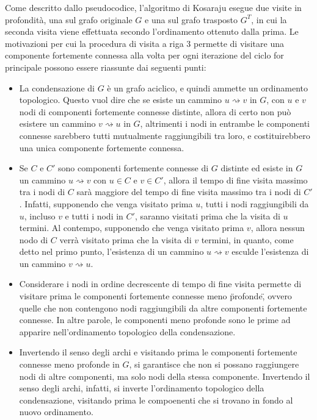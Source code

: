 

Come descritto dallo pseudocodice, l'algoritmo di Kosaraju esegue due visite in profondit\`a, una sul grafo
originale $G$ e una sul grafo trasposto $G^T$, in cui la seconda visita viene effettuata secondo l'ordinamento
ottenuto dalla prima.
Le motivazioni per cui la procedura di visita a riga 3 permette di visitare una componente fortemente
connessa alla volta per ogni iterazione del ciclo for principale possono essere riassunte dai seguenti punti:
\begin{itemize}
    \item La condensazione di $G$ \`e un grafo aciclico, e quindi ammette un ordinamento topologico.
        Questo vuol dire che se esiste un cammino $u \rightsquigarrow v$ in $G$, con $u$ e $v$ nodi di componenti
        fortemente connesse distinte, allora di certo non pu\`o esistere un cammino $v \rightsquigarrow u$ in $G$,
        altrimenti i nodi in entrambe le componenti connesse sarebbero tutti mutualmente raggiungibili tra loro, e
        costituirebbero una unica componente fortemente connessa.
    \item Se $C$ e $C'$ sono componenti fortemente connesse di $G$ distinte ed esiste in $G$ un cammino
        $u \rightsquigarrow v$ con $u \in C$ e $v \in C'$, allora il tempo di fine visita massimo tra i nodi di $C$
        sar\`a maggiore del tempo di fine visita massimo tra i nodi di $C'$.
        Infatti, supponendo che venga visitato prima $u$, tutti i nodi raggiungibili da $u$, incluso $v$ e tutti i nodi
        in $C'$, saranno visitati prima che la visita di $u$ termini.
        Al contempo, supponendo che venga visitato prima $v$, allora nessun nodo di $C$ verr\`a visitato prima che
        la visita di $v$ termini, in quanto, come detto nel primo punto, l'esistenza di un cammino
        $u \rightsquigarrow v$ esculde l'esistenza di un cammino $v \rightsquigarrow u$.
    \item Considerare i nodi in ordine decrescente di tempo di fine visita permette di visitare prima le componenti
        fortemente connesse meno \"profonde\", ovvero quelle che non contengono nodi raggiungibili da altre
        componenti fortemente connesse.
        In altre parole, le componenti meno profonde sono le prime ad apparire nell'ordinamento topologico della
        condensazione.
    \item Invertendo il senso degli archi e visitando prima le componenti fortemente connesse meno profonde in $G$, si
        garantisce che non si possano raggiungere nodi di altre componenti, ma solo nodi della stessa componente.
        Invertendo il senso degli archi, infatti, si inverte l'ordinamento topologico della condensazione, visitando
        prima le compoenenti che si trovano in fondo al nuovo ordinamento.
\end{itemize}


